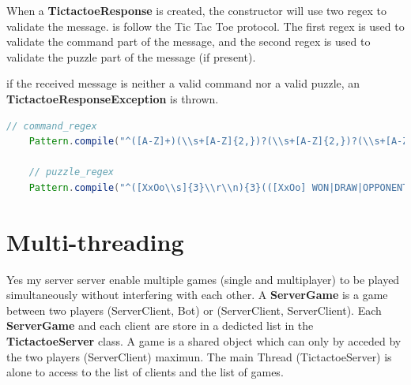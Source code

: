 \documentclass[11pt]{article}
\begin{document}
When a \textbf{TictactoeResponse} is created, the constructor will use two regex to validate the message.
is follow the Tic Tac Toe protocol. The first regex is used to validate the command part of the message,
and the second regex is used to validate the puzzle part of the message (if present).

if the received message is neither a valid command nor a valid puzzle, an \textbf{TictactoeResponseException} is thrown.

\begin{lstlisting}[style=javaStyle, language=Java, caption={Response parsing in TictactoeResponse}]
    // command_regex
    Pattern.compile("^([A-Z]+)(\\s+[A-Z]{2,})?(\\s+[A-Z]{2,})?(\\s+[A-Za-z]|\\s+\\-?[0-9]+)?(\\s+[A-Za-z]|\\s+\\-?[0-9]+)?\\s*\\r\\n(\\r\\n)?$");

    // puzzle_regex
    Pattern.compile("^([XxOo\\s]{3}\\r\\n){3}(([XxOo] WON|DRAW|OPPONENT QUIT)\\r\\n)?(\\r\\n)?$");
\end{lstlisting}

\section{Multi-threading}
Yes my server server enable multiple games (single and multiplayer) to be played simultaneously without interfering with each other.
A \textbf{ServerGame} is a game between two players (ServerClient, Bot) or (ServerClient, ServerClient). Each \textbf{ServerGame} and each 
client are store in a dedicted list in the \textbf{TictactoeServer} class. \newline
A game is a shared object which can only by acceded by the two players (ServerClient) maximun. \newline
The main Thread (TictactoeServer) is alone to access to the list of clients and the list of games.
\end{document}
